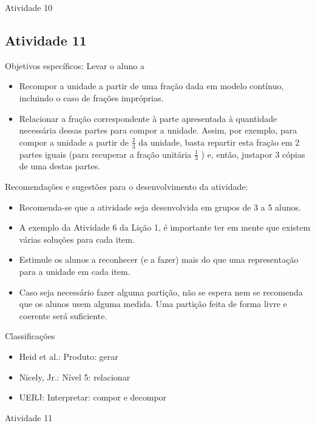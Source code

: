 \documentclass[oneside]{book}
\begin{document}
\begin{multicols}{2}
\begin{resposta*}{Atividade 10}
\end{resposta*}



\subsection{Atividade 11}

  Objetivos específicos: Levar o aluno a
\begin{itemize} %
    \item       Recompor a unidade a partir de uma fração dada em modelo contínuo, incluindo o caso de frações impróprias.
    \item       Relacionar a fração correspondente à parte apresentada à quantidade necessária dessas partes para compor a unidade. Assim, por exemplo, para compor a unidade a partir de       $\frac{2}{3}$       da unidade, basta repartir esta fração em 2 partes iguais (para recuperar a fração unitária       $\frac{1}{3}$      ) e, então, justapor 3 cópias de uma destas partes.
\end{itemize} %

  Recomendações e sugestões para o desenvolvimento da atividade:
\begin{itemize} %
    \item       Recomenda-se que a atividade seja desenvolvida em grupos de 3 a 5 alunos.
    \item       A exemplo da Atividade 6 da Lição 1, é importante ter em mente que existem várias soluções para cada item.
    \item       Estimule os alunos a reconhecer (e a fazer) mais do que uma representação para a unidade em cada item.
    \item       Caso seja necessário fazer alguma partição, não se espera nem se recomenda que os alunos usem alguma medida. Uma partição feita de forma livre e coerente será suficiente.
\end{itemize} %

  Classificações
\begin{itemize} %
    \item       Heid et al.: Produto: gerar
    \item       Nicely, Jr.: Nível 5: relacionar
    \item       UERJ: Interpretar: compor e decompor
\end{itemize} %

\begin{resposta*}{Atividade 11}




\end{resposta*}
\end{multicols}
\end{document}
